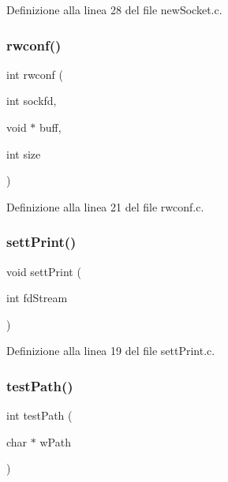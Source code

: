 Definizione alla linea 28 del file new\+Socket.\+c.

\mbox{\label{a00050_ab2c6a8994eb18fd01ebda77f51847bab}} 
\subsubsection{\texorpdfstring{rwconf()}{rwconf()}}
{\footnotesize\ttfamily int rwconf (\begin{DoxyParamCaption}\item[{int}]{sockfd,  }\item[{void $\ast$}]{buff,  }\item[{int}]{size }\end{DoxyParamCaption})}



Definizione alla linea 21 del file rwconf.\+c.

\mbox{\label{a00050_a97f7da246f13aa6b171eba5834af3e94}} 
\subsubsection{\texorpdfstring{settPrint()}{settPrint()}}
{\footnotesize\ttfamily void sett\+Print (\begin{DoxyParamCaption}\item[{int}]{fd\+Stream }\end{DoxyParamCaption})}



Definizione alla linea 19 del file sett\+Print.\+c.

\mbox{\label{a00050_ad53b7ea4b153982d90a2c13cc2712980}} 
\subsubsection{\texorpdfstring{testPath()}{testPath()}}
{\footnotesize\ttfamily int test\+Path (\begin{DoxyParamCaption}\item[{char $\ast$}]{w\+Path }\end{DoxyParamCaption})}




